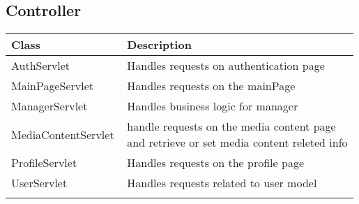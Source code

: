 \subsection*{Controller}
\renewcommand{\arraystretch}{1.5}
\begin{longtable}{|>{\arraybackslash}p{0.33\linewidth}|>{\arraybackslash}p{0.66\linewidth}|}
    \cline{1-2}
    \textbf{Class} & \textbf{Description} \\
    \cline{1-2}
    AuthServlet & Handles requests on authentication page \\
    \cline{1-2}
    MainPageServlet & Handles requests on the mainPage \\
    \cline{1-2}
    ManagerServlet & Handles business logic for manager \\    
    \cline{1-2}
    MediaContentServlet & handle requests on the media content page and retrieve or set media content releted info \\
    \cline{1-2}
    ProfileServlet & Handles requests on the profile page \\
    \cline{1-2}
    UserServlet & Handles requests related to user model \\
    \cline{1-2}
\end{longtable}

\newpage

